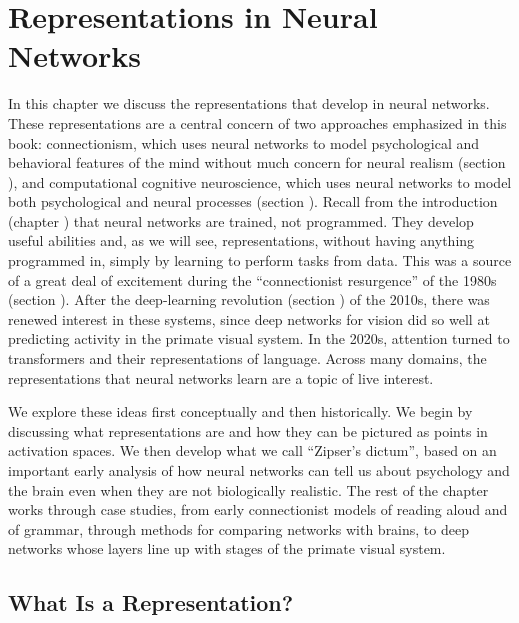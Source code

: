 \chapter{Representations in Neural Networks}\label{ch_representations}

In this chapter we discuss the representations that develop in neural networks. These representations are a central concern of two approaches emphasized in this book: connectionism, which uses neural networks to model psychological and behavioral features of the mind without much concern for neural realism (section ), and computational cognitive neuroscience, which uses neural networks to model both psychological and neural processes (section ). Recall from the introduction (chapter ) that neural networks are trained, not programmed. They develop useful abilities and, as we will see, representations, without having anything programmed in, simply by learning to perform tasks from data. This was a source of a great deal of excitement during the ``connectionist resurgence'' of the 1980s (section ). After the deep-learning revolution (section ) of the 2010s, there was renewed interest in these systems, since deep networks for vision did so well at predicting activity in the primate visual system. In the 2020s, attention turned to transformers and their representations of language. Across many domains, the representations that neural networks learn are a topic of live interest.

We explore these ideas first conceptually and then historically. We begin by discussing what representations are and how they can be pictured as points in activation spaces. We then develop what we call ``Zipser's dictum'', based on an important early analysis of how neural networks can tell us about psychology and the brain even when they are not biologically realistic. The rest of the chapter works through case studies, from early connectionist models of reading aloud and of grammar, through methods for comparing networks with brains, to deep networks whose layers line up with stages of the primate visual system.



\section{What Is a Representation?}\label{sect_whatIsRep}


